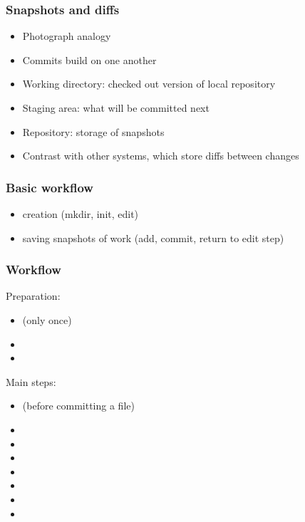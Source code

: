 \begin{frame}
\frametitle{Snapshots and diffs}
\begin{itemize}
    \item Photograph analogy
    \item Commits build on one another
    \item Working directory: checked out version of local repository
    \item Staging area: what will be committed next
    \item Repository: storage of snapshots
    \item Contrast with other systems, which store diffs between changes
\end{itemize}
\end{frame}

\begin{frame}
\frametitle{Basic workflow}
\begin{itemize}
    \item creation (mkdir, init, edit)
    \item saving snapshots of work (add, commit, return to edit step)
\end{itemize}
\end{frame}

\begin{frame}
\frametitle{Workﬂow}

Preparation:
\begin{itemize}
    \item {} (only once)
    \item {}
    \item {}
\end{itemize}

Main steps:
\begin{itemize}
    \item {} (before committing a file)
    \item {}
    \item {}
    \item {}
    \item {}
    \item {}
    \item {}
    \item {}
\end{itemize}
\end{frame}


